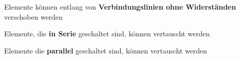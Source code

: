 					\fix
\fix \fix
					\beginip
						Elemente können entlang von \textbf{Verbindungslinien ohne Widerständen} verschoben werden\\
						\begin{center}
							\fix \fix \fix
						\end{center}
					\iend
\fix \fix
					\beginip
						Elemente, die \textbf{in Serie} geschaltet sind, können vertauscht werden
						\begin{center}
							\fix
						\end{center}
					\iend
\fix \fix
					\beginip
						Elemente die \textbf{parallel} geschaltet sind, können vertauscht werden
						\begin{center}
							\fix
						\end{center}
